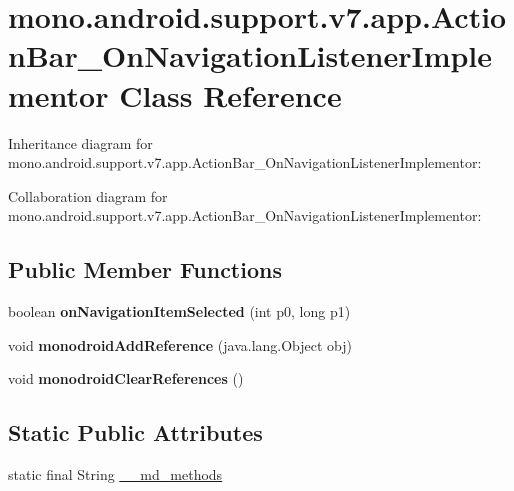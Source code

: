 \hypertarget{classmono_1_1android_1_1support_1_1v7_1_1app_1_1_action_bar___on_navigation_listener_implementor}{}\section{mono.\+android.\+support.\+v7.\+app.\+Action\+Bar\+\_\+\+On\+Navigation\+Listener\+Implementor Class Reference}
\label{classmono_1_1android_1_1support_1_1v7_1_1app_1_1_action_bar___on_navigation_listener_implementor}


Inheritance diagram for mono.\+android.\+support.\+v7.\+app.\+Action\+Bar\+\_\+\+On\+Navigation\+Listener\+Implementor\+:


Collaboration diagram for mono.\+android.\+support.\+v7.\+app.\+Action\+Bar\+\_\+\+On\+Navigation\+Listener\+Implementor\+:
\subsection*{Public Member Functions}
\begin{DoxyCompactItemize}
\item 
\mbox{\label{classmono_1_1android_1_1support_1_1v7_1_1app_1_1_action_bar___on_navigation_listener_implementor_aa8e79b4e1839807bbcb095ce88841c8d}} 
boolean {\bfseries on\+Navigation\+Item\+Selected} (int p0, long p1)
\item 
\mbox{\label{classmono_1_1android_1_1support_1_1v7_1_1app_1_1_action_bar___on_navigation_listener_implementor_ab81ccc974aea244bca8ff1bd961c7f3d}} 
void {\bfseries monodroid\+Add\+Reference} (java.\+lang.\+Object obj)
\item 
\mbox{\label{classmono_1_1android_1_1support_1_1v7_1_1app_1_1_action_bar___on_navigation_listener_implementor_a36832b5ba4a1ccf95e0e38fe4cab8587}} 
void {\bfseries monodroid\+Clear\+References} ()
\end{DoxyCompactItemize}
\subsection*{Static Public Attributes}
\begin{DoxyCompactItemize}
\item 
static final String \hyperlink{classmono_1_1android_1_1support_1_1v7_1_1app_1_1_action_bar___on_navigation_listener_implementor_ace41bbd5e877c139f623cae4ca078214}{\+\_\+\+\_\+md\+\_\+methods}
\end{DoxyCompactItemize}


